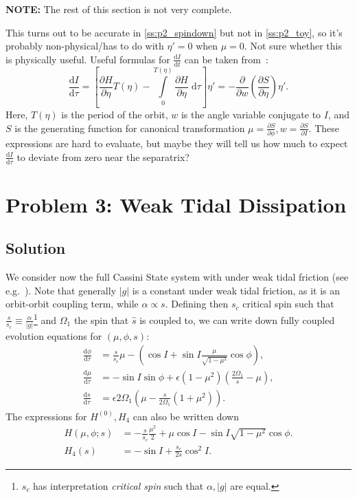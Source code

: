 \documentclass[
        fleqn,
        usenatbib,
    ]{mnras}
\newcommand*{\rd}[2]{\frac{\mathrm{d}#1}{\mathrm{d}#2}}
\newcommand*{\pd}[2]{\frac{\partial#1}{\partial#2}}
\newcommand*{\abs}[1]{\left|#1\right|}
\newcommand*{\p}[1]{\left(#1\right)}
\newcommand*{\s}[1]{\left[#1\right]}
\begin{document}
\textbf{NOTE:} The rest of this section is not very complete.

This turns out to be accurate in \autoref{ss:p2_spindown} but not in
\autoref{ss:p2_toy}, so it's probably non-physical/has to do with $\eta' = 0$
when $\mu = 0$. Not sure whether this is physically useful. Useful formulas for
$\rd{I}{t}$ can be taken from~\cite{henrard1982, l_and_l}:
\begin{equation}
    \rd{I}{\tau} = \s{\pd{H}{\eta}T(\eta) - \int\limits_0^{T(\eta)}
            \pd{H}{\eta}\;\mathrm{d}\tau} \eta'
        = -\pd{}{w}\p{\pd{S}{\eta}}\eta'.
\end{equation}
Here, $T(\eta)$ is the period of the orbit, $w$ is the angle variable conjugate
to $I$, and $S$ is the generating function for canonical transformation $\mu =
\pd{S}{\phi}, w = \pd{S}{I}$. These expressions are hard to evaluate, but maybe
they will tell us how much to expect $\rd{I}{\tau}$ to deviate from zero near
the separatrix?

\section{Problem 3: Weak Tidal Dissipation}\label{s:p3}

\subsection{Solution}

We consider now the full Cassini State system with under weak tidal friction
(see e.g.\ \cite{lai2012}). Note that generally $\abs{g}$ is a constant under
weak tidal friction, as it is an orbit-orbit coupling term, while $\alpha
\propto s$. Defining then $s_c$ critical spin such that $\frac{s}{s_c} \equiv
\frac{\alpha}{\abs{g}}$\footnote{$s_c$ has interpretation \emph{critical spin}
such that $\alpha, \abs{g}$ are equal.} and $\Omega_1$ the spin that $\hat{s}$
is coupled to, we can write down fully coupled evolution equations for $(\mu,
\phi, s)$:
\begin{subequations}\label{se:p3_eom}
    \begin{align}
        \rd{\phi}{\tau} &= \frac{s}{s_c}\mu
            - \p{\cos I + \sin I \frac{\mu}{\sqrt{1 - \mu^2}} \cos \phi},\\
        \rd{\mu}{\tau} &= -\sin I \sin \phi +
            \epsilon \p{1 - \mu^2} \p{\frac{2\Omega_1}{s} - \mu},\\
        \rd{s}{\tau}
            &= \epsilon 2\Omega_1 \p{\mu - \frac{s}{2\Omega_1}\p{1 + \mu^2}}.
    \end{align}
\end{subequations}
The expressions for $H^{(0)}, H_4$ can also be written down
\begin{align}
    H(\mu, \phi; s) &= -\frac{s}{s_c}\frac{\mu^2}{2}
        + \mu \cos I - \sin I \sqrt{1 - \mu^2}\cos \phi.\\
    H_4(s) &= -\sin I + \frac{s_c}{2s}\cos^2 I.
\end{align}
\end{document}
